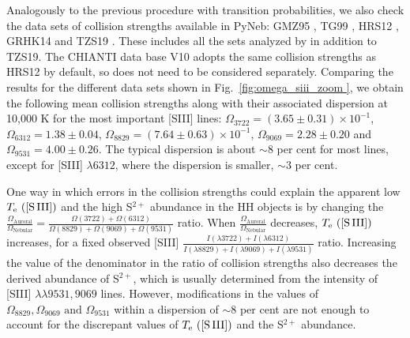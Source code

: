 \documentclass[fleqn,usenatbib]{mnras}
\begin{document}
Analogously to the previous procedure with transition probabilities, we also check the data sets of collision strengths available in PyNeb: GMZ95 \citep[][]{GMZ95}, TG99 \citep[][]{TG99}, HRS12 \citep[][]{HRS12}, GRHK14 \citep[][]{GRHK14} and TZS19 \citep[][]{TZS19}. These includes all the sets analyzed by \citet{Juan-de-Dios17} in addition to TZS19. The CHIANTI data base V10 adopts the same collision strengths as HRS12 by default, so does not need to be considered separately. Comparing the results for the different data sets shown in Fig.~\ref{fig:omega_siii_zoom }, we obtain the following mean collision strengths along  with their associated dispersion at 10,000 K for the most important [S\thinspace III] lines: $\Omega_{3722}=(3.65 \pm 0.31) \times 10^{-1}$, $\Omega_{6312}=1.38 \pm 0.04$, $\Omega_{8829}=(7.64 \pm 0.63)\times 10^{-1}$, $\Omega_{9069}=2.28 \pm 0.20$ and $\Omega_{9531}=4.00 \pm 0.26$. The typical dispersion is about $\sim 8$ per cent for most lines, except for [S\thinspace III] $\lambda 6312$, where the dispersion is smaller, $\sim 3$ per cent.

One way in which errors in the collision strengths could explain
the apparent low $T_{\rm e} \text{ ([S\thinspace III])}$ and the high S$^{2+}$ abundance in the HH objects
is by changing the  $\frac{\Omega_{\text{Auroral}}}{\Omega_{\text{Nebular}}}=\frac{\Omega(3722)+\Omega(6312)}{\Omega(8829)+\Omega(9069)+\Omega(9531)}$ ratio. When $\frac{\Omega_{\text{Auroral}}}{\Omega_{\text{Nebular}}}$ decreases, $T_{\rm e} \text{ ([S\thinspace III])}$ increases, for a fixed observed [S\thinspace III] $\frac{I(\lambda3722)+I(\lambda6312)}{I(\lambda 8829)+I(\lambda9069)+I(\lambda9531)}$ ratio. Increasing the value of the denominator in the ratio of collision strengths also decreases the derived abundance of S$^{2+}$, which is usually determined from the intensity of [S\thinspace III] $\lambda \lambda 9531, 9069$ lines. However, modifications in the values of $\Omega_{8829}, \Omega_{9069} \text{ and } \Omega_{9531}$ within a dispersion of $\sim8$ per cent are not enough to account for the discrepant values of $T_{\rm e} \text{ ([S\thinspace III])}$ and the S$^{2+}$ abundance.
\end{document}
